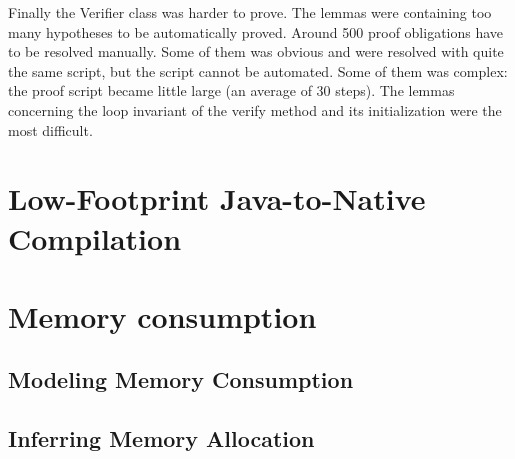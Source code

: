 Finally the Verifier class was harder to prove.
The lemmas were containing too many hypotheses to be automatically proved.
Around 500 proof obligations have to be resolved manually.
Some of them was obvious and were resolved with quite the same script, but the script cannot be automated.
Some of them was complex: the proof script became little large (an average of 30 steps).
The lemmas concerning the loop invariant of the verify method and its initialization were the most difficult.
\section{Low-Footprint Java-to-Native Compilation}

\section{Memory consumption}

%
\subsection{Modeling Memory Consumption}\label{sec:verif}

\subsection{Inferring Memory Allocation}\label{sec:infer}

%
